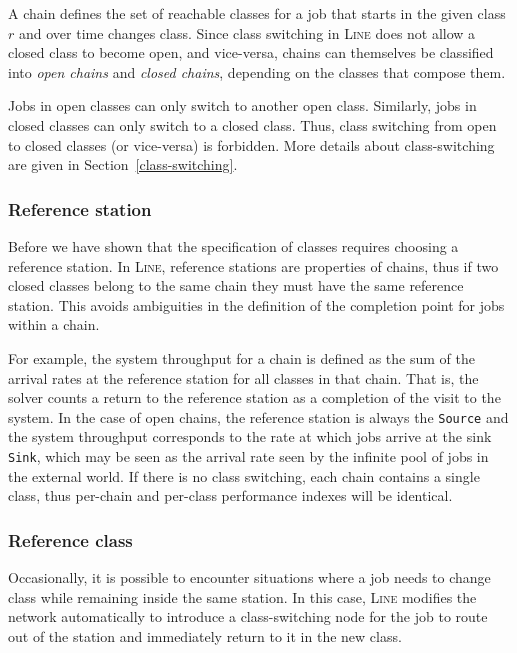 A chain defines the set of reachable classes for a job that starts in the given class $r$ and over time changes class. Since class switching in \textsc{Line} does not allow a closed class to become open, and vice-versa, chains can themselves be classified into {\em open chains} and {\em closed chains}, depending on the classes that compose them.

Jobs in open classes can only switch to another open class. Similarly, jobs in closed classes can only switch to a closed class. Thus, class switching from open to closed classes (or vice-versa) is forbidden. More details about class-switching are given in Section~\ref{class-switching}.

\subsubsection{Reference station}
\label{reference-station}
Before we have shown that the specification of classes requires choosing a reference station. In \textsc{Line}, reference stations are properties of chains, thus if two closed classes belong to the same chain they must have the same reference station. This avoids ambiguities in the definition of the completion point for jobs within a chain.

For example, the system throughput for a chain is defined as the sum of the arrival rates at the reference station for all classes in that chain. That is, the solver counts a return to the reference station as a completion of the visit to the system. In the case of open chains, the reference station is always the \texttt{Source} and the system throughput corresponds to the rate at which jobs arrive at the sink \texttt{Sink}, which may be seen as the arrival rate seen by the infinite pool of jobs in the external world. If there is no class switching, each chain contains a single class, thus per-chain and per-class performance indexes will be identical.

\subsubsection{Reference class}
\label{reference-class}
Occasionally, it is possible to encounter situations where a job needs to change class while remaining inside the same station. In this case, \textsc{Line} modifies the network automatically to introduce a class-switching node for the job to route out of the station and immediately return to it in the new class. 

